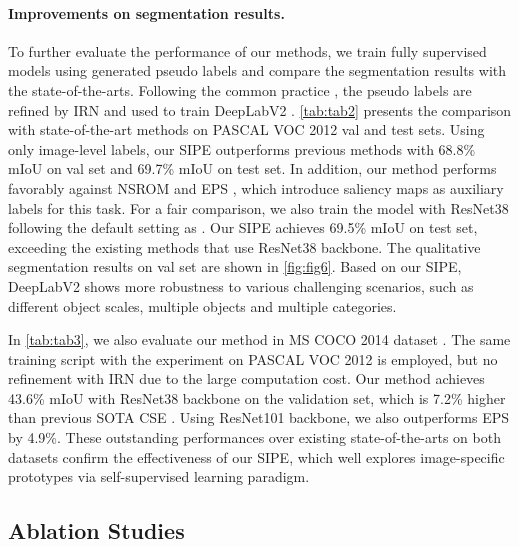 \documentclass[10pt,twocolumn,letterpaper]{article}
\begin{document}
\paragraph{Improvements on segmentation results.}
To further evaluate the performance of our methods, we train fully supervised models using generated pseudo labels and compare the segmentation results with the state-of-the-arts.
Following the common practice \cite{lee2021anti}, the pseudo labels are refined by IRN \cite{ahn2019weakly} and used to train DeepLabV2 \cite{chen2017deeplab}.
\cref{tab:tab2} presents the comparison with state-of-the-art methods on PASCAL VOC 2012 val and test sets.
Using only image-level labels, our SIPE outperforms previous methods with 68.8\% mIoU on val set and 69.7\% mIoU on test set.
In addition, our method performs favorably against NSROM \cite{yao2021non} and EPS \cite{lee2021railroad}, which introduce saliency maps as auxiliary labels for this task.
For a fair comparison, we also train the model with ResNet38 following the default setting as \cite{wang2020self}.
Our SIPE achieves 69.5\% mIoU on test set, exceeding the existing methods that use ResNet38 backbone.
The qualitative segmentation results on val set are shown in \cref{fig:fig6}.
Based on our SIPE, DeepLabV2 shows more robustness to various challenging scenarios, such as different object scales, multiple objects and multiple categories.

In \cref{tab:tab3}, we also evaluate our method in MS COCO 2014 dataset \cite{lin2014coco}.
The same training script with the experiment on PASCAL VOC 2012 is employed, but no refinement with IRN due to the large computation cost.
Our method achieves 43.6\% mIoU with ResNet38 backbone on the validation set, which is 7.2\% higher than previous SOTA CSE \cite{Kweon2021unlock}.
Using ResNet101 backbone, we also outperforms EPS \cite{lee2021railroad} by 4.9\%.
These outstanding performances over existing state-of-the-arts on both datasets confirm the effectiveness of our SIPE, which well explores image-specific prototypes via self-supervised learning paradigm.

\subsection{Ablation Studies}

\end{document}
